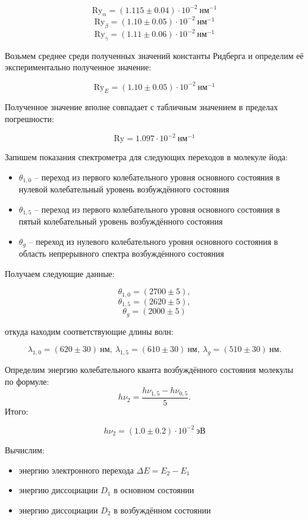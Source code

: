 \[ \text{Ry}_{\alpha}=(1.115\pm 0.04) \cdot 10^{-2} \ \text{нм}^{-1} \]
\[ \text{Ry}_{\beta} =(1.10\pm 0.05)\cdot 10^{-2} \ \text{нм}^{-1} \]
\[ \text{Ry}_{\gamma}=(1.11\pm 0.06)\cdot 10^{-2}\ \text{нм}^{-1} \]


Возьмем среднее среди полученных значений константы Ридберга и определим её
экспериментально полученное значение:

\[ \text{Ry}_E=(1.10\pm 0.05)\cdot 10^{-2} ~\text{нм}^{-1} \]

Полученное значение вполне совпадает с табличным значением в пределах
погрешности:

\[ \text{Ry}=1.097\cdot 10^{-2} \ \text{нм}^{-1} \]

Запишем показания спектрометра для следующих переходов в молекуле йода:
\begin{itemize}
  \item $\theta_{1,0}$ -- переход из первого колебательного уровня
        основного состояния в нулевой колебательный уровень возбуждённого
        состояния
  \item $\theta_{1,5}$ -- переход из первого колебательного уровня
        основного состояния в пятый колебательный уровень возбуждённого
        состояния
  \item $\theta_{g}$ -- переход из нулевого колебательного уровня
        основного состояния в область непрерывного спектра возбуждённого
        состояния
\end{itemize}

Получаем следующие данные:

\[  \theta_{1,0}=(2700\pm 5), \]
\[  \theta_{1,5}=(2620\pm 5), \]
\[  \theta_g=(2000\pm 5)  \]

откуда находим соответствующие длины волн:

\begin{equation*}
  \lambda_{1,0}=(620\pm 30) \ \text{нм}, \ \lambda_{1,5}=(610\pm 30) \ \text{нм}, \ \lambda_g=(510\pm 30)\ \text{нм}.
\end{equation*}

Определим энергию колебательного кванта возбуждённого состояния молекулы по
формуле:
\begin{equation*}
  h \nu_2=\dfrac{h\nu_{1,5}-h \nu_{0,5}}{5}.
\end{equation*}
Итого:

\[  h\nu_2=(1.0\pm 0.2)\cdot 10^{-2} \ \text{эВ} \]

Вычислим:
\begin{itemize}
  \item энергию электронного перехода $\Delta E=E_2-E_1$
  \item энергию диссоциации $D_1$ в основном состоянии
  \item энергию диссоциации $D_2$ в возбуждённом состоянии
\end{itemize}


